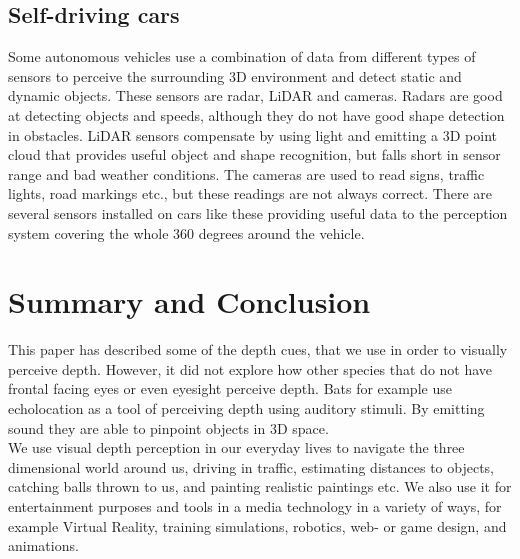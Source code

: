 	\subsection{Self-driving cars}
	Some autonomous vehicles use a combination of data from different types of sensors to perceive the surrounding 3D environment and detect static and dynamic objects. These sensors are radar, LiDAR and cameras. Radars are good at detecting objects and speeds, although they do not have good shape detection in obstacles. LiDAR sensors compensate by using light and emitting a 3D point cloud that provides useful object and shape recognition, but falls short in sensor range and bad weather conditions. The cameras are used to read signs, traffic lights, road markings etc., but these readings are not always correct. There are several sensors installed on cars like these providing useful data to the perception system covering the whole 360 degrees around the vehicle\citep{selfdrivingCars}.
	

\section{Summary and Conclusion}
This paper has described some of the depth cues, that we use in order to visually perceive depth. However, it did not explore how other species that do not have frontal facing eyes or even eyesight perceive depth. Bats for example use echolocation as a tool of perceiving depth using auditory stimuli. By emitting sound they are able to pinpoint objects in 3D space\citep[p.~381]{sensationPerception}.\\

We use visual depth perception in our everyday lives to navigate the three dimensional world around us, driving in traffic, estimating distances to objects, catching balls thrown to us, and painting realistic paintings etc. We also use it for entertainment purposes and tools in a media technology in a variety of ways, for example Virtual Reality, training simulations, robotics, web- or game design, and animations.


